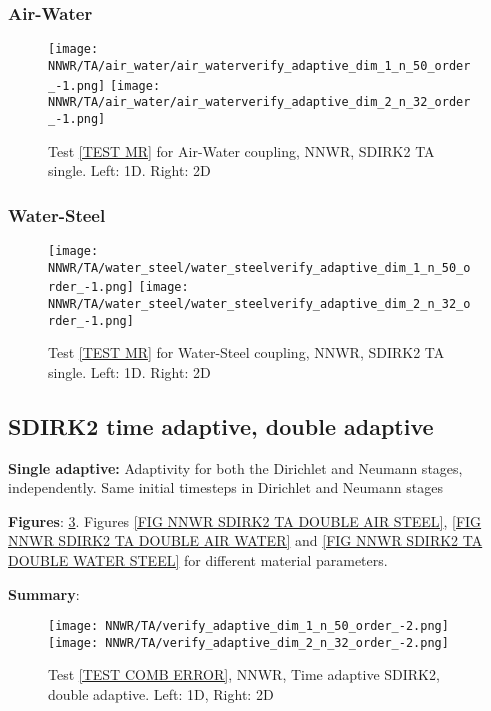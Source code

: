\documentclass[a4paper,10pt]{article}
\begin{document}
\FloatBarrier
\subsubsection{Air-Water}\label{SEC NNWR TA SINGLE AIR WATER}
% 

\begin{figure}[!ht]
\texttt{[image: NNWR/TA/air\_water/air\_waterverify\_adaptive\_dim\_1\_n\_50\_order\_-1.png]}
\texttt{[image: NNWR/TA/air\_water/air\_waterverify\_adaptive\_dim\_2\_n\_32\_order\_-1.png]}
\caption{Test \ref{TEST MR} for Air-Water coupling, NNWR, SDIRK2 TA single. Left: 1D. Right: 2D}
\label{FIG NNWR SDIRK2 TA SINGLE AIR WATER}
\end{figure}

\FloatBarrier
\subsubsection{Water-Steel}\label{SEC NNWR TA SINGLE WATER STEEL}
% 

\begin{figure}[!ht]
\texttt{[image: NNWR/TA/water\_steel/water\_steelverify\_adaptive\_dim\_1\_n\_50\_order\_-1.png]}
\texttt{[image: NNWR/TA/water\_steel/water\_steelverify\_adaptive\_dim\_2\_n\_32\_order\_-1.png]}
\caption{Test \ref{TEST MR} for Water-Steel coupling, NNWR, SDIRK2 TA single. Left: 1D. Right: 2D}
\label{FIG NNWR SDIRK2 TA SINGLE WATER STEEL}
\end{figure}

\FloatBarrier
\subsection{SDIRK2 time adaptive, double adaptive}\label{SEC NNWR SDIRK2 TA DOUBLE}
% 
\textbf{Single adaptive:} Adaptivity for both the Dirichlet and Neumann stages, independently.  Same initial timesteps in Dirichlet and Neumann stages

\textbf{Figures}: \ref{FIG NNWR SDIRK2 TA DOUBLE ERROR}. Figures \ref{FIG NNWR SDIRK2 TA DOUBLE AIR STEEL}, \ref{FIG NNWR SDIRK2 TA DOUBLE AIR WATER} and \ref{FIG NNWR SDIRK2 TA DOUBLE WATER STEEL} for different material parameters.

\textbf{Summary}: 

\begin{figure}[!ht]
\texttt{[image: NNWR/TA/verify\_adaptive\_dim\_1\_n\_50\_order\_-2.png]}
\texttt{[image: NNWR/TA/verify\_adaptive\_dim\_2\_n\_32\_order\_-2.png]}
\caption{Test \ref{TEST COMB ERROR}, NNWR, Time adaptive SDIRK2, double adaptive. Left: 1D, Right: 2D}
\label{FIG NNWR SDIRK2 TA DOUBLE ERROR}
\end{figure}
\end{document}
